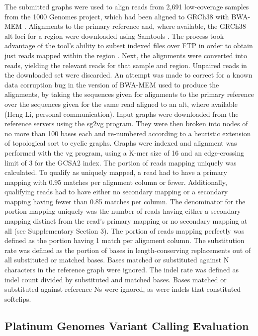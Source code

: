 The submitted graphs were used to align reads from 2,691 low-coverage
samples from the 1000 Genomes project, which had been aligned to GRCh38
with BWA-MEM \cite{Li2009-tj}. Alignments to the primary reference and,
where available, the GRCh38 alt loci for a region were downloaded using
Samtools \cite{Li2009-je}. The process took advantage of the tool's
ability to subset indexed files over FTP in order to obtain just reads
mapped within the region \cite{Li2009-je}. Next, the alignments were
converted into reads, yielding the relevant reads for that sample and
region. Unpaired reads in the downloaded set were discarded. An attempt
was made to correct for a known data corruption bug in the version of
BWA-MEM used to produce the alignments, by taking the sequences given
for alignments to the primary reference over the sequences given for the
same read aligned to an alt, where available (Heng Li, personal
communication). Input graphs were downloaded from the reference servers
using the sg2vg program. They were then broken into nodes of no more
than 100 bases each and re-numbered according to a heuristic extension
of topological sort to cyclic graphs. Graphs were indexed and alignment
was performed with the vg program, using a K-mer size of 16 and an
edge-crossing limit of 3 for the GCSA2 index. The portion of reads
mapping uniquely was calculated. To qualify as uniquely mapped, a read
had to have a primary mapping with 0.95 matches per alignment column or
fewer. Additionally, qualifying reads had to have either no secondary
mapping or a secondary mapping having fewer than 0.85 matches per
column. The denominator for the portion mapping uniquely was the number
of reads having either a secondary mapping distinct from the read's
primary mapping or no secondary mapping at all (see Supplementary
Section 3). The portion of reads mapping perfectly was defined as the
portion having 1 match per alignment column. The substitution rate was
defined as the portion of bases in length-conserving replacements out of
all substituted or matched bases. Bases matched or substituted against N
characters in the reference graph were ignored. The indel rate was
defined as indel count divided by substituted and matched bases. Bases
matched or substituted against reference Ns were ignored, as were indels
that constituted softclips.

\subsection{Platinum Genomes Variant Calling Evaluation}

